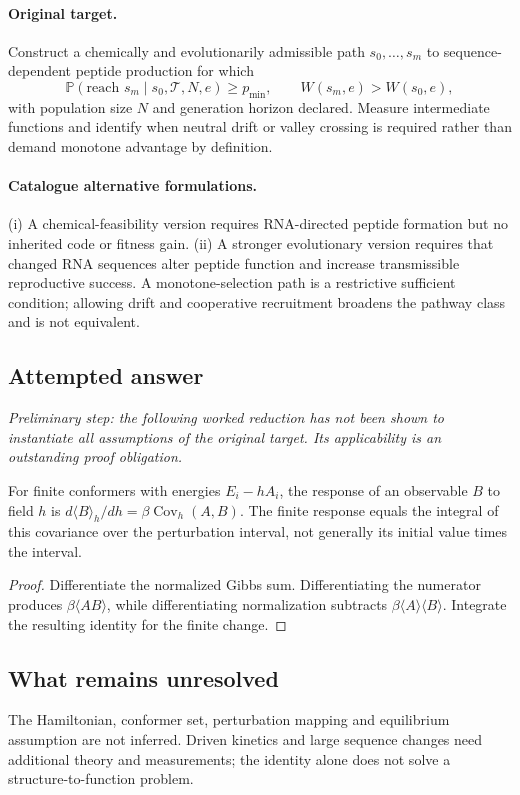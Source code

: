 \documentclass[11pt]{article}
\begin{document}
\paragraph{Original target.}
Construct a chemically and evolutionarily admissible path $s_0,\ldots,s_m$ to sequence-dependent peptide production for which
\[
\mathbb{P}(\text{reach }s_m\mid s_0,\mathcal T,N,e)\geq p_{\min},
\qquad W(s_m,e)>W(s_0,e),
\]
with population size $N$ and generation horizon declared. Measure intermediate functions and identify when neutral drift or valley crossing is required rather than demand monotone advantage by definition.
\paragraph{Catalogue alternative formulations.}
(i) A chemical-feasibility version requires RNA-directed peptide formation but no inherited code or fitness gain. (ii) A stronger evolutionary version requires that changed RNA sequences alter peptide function and increase transmissible reproductive success. A monotone-selection path is a restrictive sufficient condition; allowing drift and cooperative recruitment broadens the pathway class and is not equivalent.
\subsection{Attempted answer}
\noindent\emph{Preliminary step: the following worked reduction has not been shown to instantiate all assumptions of the original target. Its applicability is an outstanding proof obligation.}

\begin{proposition}
For finite conformers with energies $E_i-hA_i$, the response of an observable $B$ to field $h$ is $d\langle B\rangle_h/dh=\beta\operatorname{Cov}_h(A,B)$. The finite response equals the integral of this covariance over the perturbation interval, not generally its initial value times the interval.
\end{proposition}
\begin{proof}
Differentiate the normalized Gibbs sum. Differentiating the numerator produces $\beta\langle AB\rangle$, while differentiating normalization subtracts $\beta\langle A\rangle\langle B\rangle$. Integrate the resulting identity for the finite change.
\end{proof}
\subsection{What remains unresolved}
The Hamiltonian, conformer set, perturbation mapping and equilibrium assumption are not inferred. Driven kinetics and large sequence changes need additional theory and measurements; the identity alone does not solve a structure-to-function problem.
\end{document}
